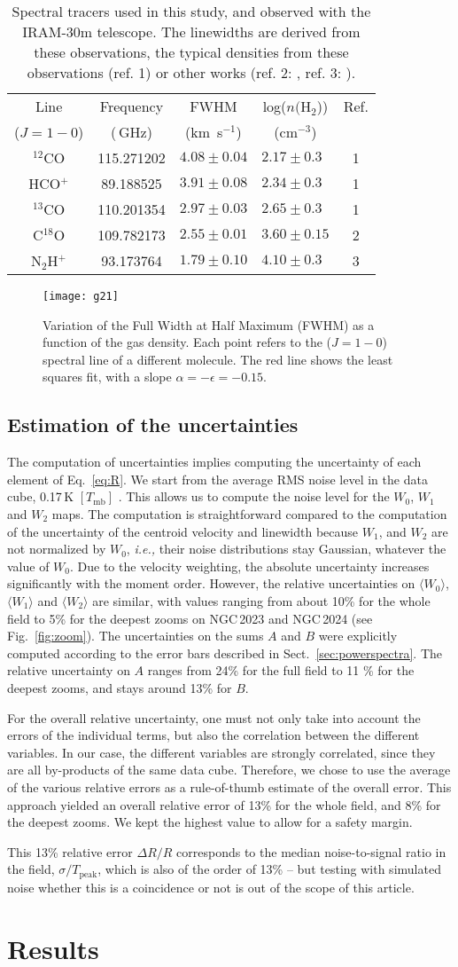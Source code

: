 \documentclass[structabstract]{aa}
\newcommand{\ie}{{\em i.e.,}}
\newcommand{\emm}[1]{\ensuremath{#1}}
\newcommand{\emr}[1]{\emm{\mathrm{#1}}}
\newcommand{\unit}[1]{\emr{\,#1}}
\newcommand{\GHz}{\unit{GHz}}
\newcommand{\K}{\unit{K}}
\newcommand{\FigGtwoone}{%
  \begin{figure}
    \centering
    \texttt{[image: g21]}
    \caption{Variation of the Full Width at Half Maximum (FWHM) as a function of the gas density. Each point refers to the ($J=1-0$) spectral line of a different molecule. The red line shows the least squares fit, with a slope  $\alpha = -\epsilon = -0.15$. }
    \label{fig:g21}
  \end{figure}}
\newcommand{\TabMolecules}{
  \begin{table}
    \centering
    \caption{Spectral tracers used in this study, and observed with the IRAM-30m telescope. The linewidths are derived from these observations, the typical densities from these observations (ref. 1) or other works (ref. 2: \citet{hilyblant05}, ref. 3: \citet{kirk16}).}
    \begin{tabular}{ccccc}
      \hline
      \hline
	  Line & Frequency & FWHM & log($n($H$_2$)) & Ref. \\
	  ($J=1-0$) & (\GHz) & (km~s$^{-1}$) & (cm$^{-3}$) & \\ 
	  \hline
	  $^{12}$CO & 115.271202 & $4.08 \pm 0.04 $  &  $2.17 \pm 0.3\phantom{0}$ & 1 \\
	  HCO$^+$ & \phantom{0}89.188525 & $3.91 \pm 0.08 $  &   $2.34 \pm 0.3\phantom{0}$ & 1\\
	  $^{13}$CO & 110.201354 & $2.97 \pm 0.03 $  &  $2.65 \pm 0.3\phantom{0}$ & 1 \\
	  C$^{18}$O & 109.782173 & $2.55 \pm 0.01 $  &  $3.60 \pm 0.15$ & 2  \\
	  N$_2$H$^+$ & \phantom{0}93.173764 & $1.79 \pm 0.10 $   &  $4.10 \pm 0.3\phantom{0}$ & 3 \\
	  \hline
	\end{tabular}
    \label{tab:molecules}
  \end{table}}
\begin{document}
\TabMolecules{} 

\FigGtwoone{}

\subsection{Estimation of the uncertainties}
The computation of uncertainties implies computing the uncertainty of each element of Eq.~\ref{eq:R}. We start from the average RMS noise level in the data cube, 0.17\K{} $[T_{\emr{mb}}]$ . This allows us to compute the noise level for the $W_0$, $W_1$ and $W_2$ maps. The computation is straightforward compared to the computation of the uncertainty of the centroid velocity and linewidth because $W_1$, and $W_2$ are not normalized by $W_0$, \ie{} their noise distributions stay Gaussian, whatever the value of $W_0$.
Due to the velocity weighting, the absolute uncertainty increases significantly with the moment order. However, the relative uncertainties on $\langle W_0 \rangle$, $\langle W_1 \rangle$ and $\langle W_2 \rangle$ are similar, with values  ranging from about 10\% for the whole field to 5\% for the deepest zooms on NGC\,2023 and NGC\,2024 (see Fig.~\ref{fig:zoom}).
The uncertainties on the sums $A$ and $B$ were explicitly computed according to the error bars described in Sect.~\ref{sec:powerspectra}. The relative uncertainty on $A$ ranges from 24\% for the full field to 11 \% for the deepest zooms, and stays around 13\% for $B$.

For the overall relative uncertainty, one must not only take into account the errors of the individual terms, but also the correlation between the different variables. In our case, the different variables are strongly correlated, since they are all by-products of the same data cube. Therefore, we chose to use the average of the various relative errors as a rule-of-thumb estimate of the overall error. This approach yielded an overall relative error of 13\% for the whole field, and 8\% for the deepest zooms. We kept the highest value to allow for a safety margin.

This 13\% relative error $\Delta R/R$ corresponds to the median noise-to-signal ratio in the field, $\sigma/T_\emr{peak}$, which is also of the order of 13\% -- but testing with simulated noise whether this is a coincidence or not is out of the scope of this article. 

\section{Results}
\end{document}
